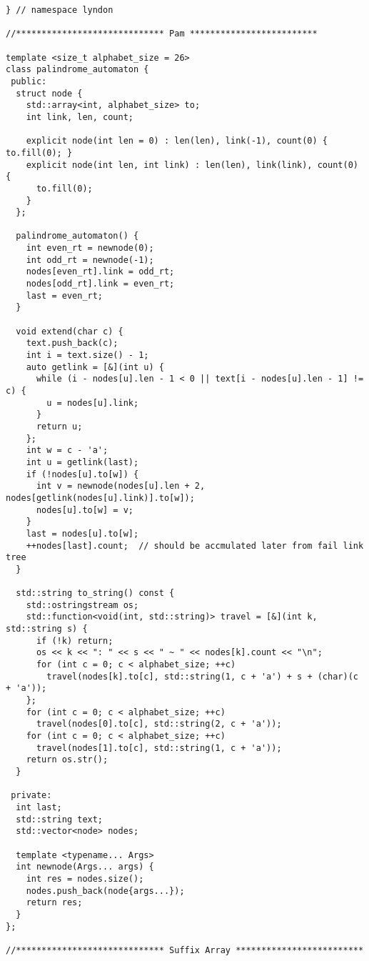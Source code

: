 \documentclass[6pt]{article}
\begin{document}
\begin{multicols}{2}
\begin{lstlisting}
} // namespace lyndon

//***************************** Pam *************************

template <size_t alphabet_size = 26>
class palindrome_automaton {
 public:
  struct node {
    std::array<int, alphabet_size> to;
    int link, len, count;

    explicit node(int len = 0) : len(len), link(-1), count(0) { to.fill(0); }
    explicit node(int len, int link) : len(len), link(link), count(0) {
      to.fill(0);
    }
  };

  palindrome_automaton() {
    int even_rt = newnode(0);
    int odd_rt = newnode(-1);
    nodes[even_rt].link = odd_rt;
    nodes[odd_rt].link = even_rt;
    last = even_rt;
  }

  void extend(char c) {
    text.push_back(c);
    int i = text.size() - 1;
    auto getlink = [&](int u) {
      while (i - nodes[u].len - 1 < 0 || text[i - nodes[u].len - 1] != c) {
        u = nodes[u].link;
      }
      return u;
    };
    int w = c - 'a';
    int u = getlink(last);
    if (!nodes[u].to[w]) {
      int v = newnode(nodes[u].len + 2, nodes[getlink(nodes[u].link)].to[w]);
      nodes[u].to[w] = v;
    }
    last = nodes[u].to[w];
    ++nodes[last].count;  // should be accmulated later from fail link tree
  }

  std::string to_string() const {
    std::ostringstream os;
    std::function<void(int, std::string)> travel = [&](int k, std::string s) {
      if (!k) return;
      os << k << ": " << s << " ~ " << nodes[k].count << "\n";
      for (int c = 0; c < alphabet_size; ++c)
        travel(nodes[k].to[c], std::string(1, c + 'a') + s + (char)(c + 'a'));
    };
    for (int c = 0; c < alphabet_size; ++c)
      travel(nodes[0].to[c], std::string(2, c + 'a'));
    for (int c = 0; c < alphabet_size; ++c)
      travel(nodes[1].to[c], std::string(1, c + 'a'));
    return os.str();
  }

 private:
  int last;
  std::string text;
  std::vector<node> nodes;

  template <typename... Args>
  int newnode(Args... args) {
    int res = nodes.size();
    nodes.push_back(node{args...});
    return res;
  }
};

//***************************** Suffix Array *************************


\end{lstlisting}
\end{multicols}
\end{document}
